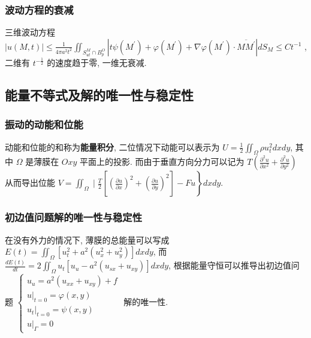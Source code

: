 \documentclass[10pt]{yerbaformat}
\begin{document}
\subsubsection{波动方程的衰减}
\par 三维波动方程 $|u(M, t)| \leqslant \frac{1}{4 \pi a^{2} t^{2}} \iint_{S_{u t}^{M} \cap B_{p}^{O}}\left|t \psi\left(M^{\prime}\right)+\varphi\left(M^{\prime}\right)+\nabla \varphi\left(M^{\prime}\right) \cdot \overline{M M^{\prime}}\right| d S_{M}\leqslant C t^{-1}$ , 二维有 $t^{-\frac{1}{2}}$ 的速度趋于零, 一维无衰减.

\subsection{能量不等式及解的唯一性与稳定性}

\subsubsection{振动的动能和位能}

\par 动能和位能的和称为\textbf{能量积分}, 二位情况下动能可以表示为 $U=\frac{1}{2} \iint_{\Omega} \rho u_{t}^{2} d x d y$, 其中 $\Omega$ 是薄膜在 $O x y$ 平面上的投影. 而由于垂直方向分力可以记为 $T\left(\frac{\partial^{2} u}{\partial x^{2}}+\frac{\partial^{2} u}{\partial y^{2}}\right)$ 从而导出位能 $\left.V=\iint_{\Omega} \mid \frac{T}{2}\left[\left(\frac{\partial u}{\partial x}\right)^{2}+\left(\frac{\partial u}{\partial y}\right)^{2}\right]-F u\right\} d x d y$.

\subsubsection{初边值问题解的唯一性与稳定性}

\par 在没有外力的情况下, 薄膜的总能量可以写成 $E(t)=\iint_{\Omega}\left[u_{t}^{2}+a^{2}\left(u_{x}^{2}+u_{y}^{2}\right)\right] d x d y$, 而 $\frac{d E(t)}{d t} =2 \iint_{\Omega} u_{t}\left[u_{u}-a^{2}\left(u_{s x}+u_{x y}\right)\right] d x d y$, 根据能量守恒可以推导出初边值问题 $\left\{\begin{array}{l}\left.u_{u}=a^{2}\left(u_{x x}+u_{x y}\right)+f\right. \\ \left.u\right|_{t=0}=\varphi(x, y) \\ \left.u_{t}\right|_{t=0}=\psi(x, y) \\ \left.u\right|_{\Gamma}=0\end{array}\right. \label{problem}$ 解的唯一性.
\end{document}
